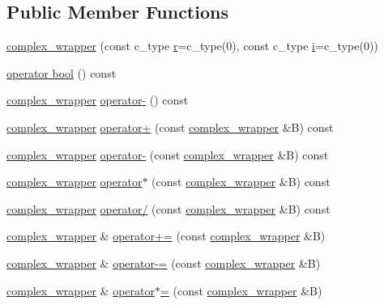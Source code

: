 \subsection*{Public Member Functions}
\begin{DoxyCompactItemize}
\item 
\hyperlink{classcomplex__wrapper_a6f027999d375bf7337f70188d937a470}{complex\+\_\+wrapper} (const c\+\_\+type \hyperlink{indexexpr_8h_ac434fd11cc2493608d8d91424d60c17e}{r}=c\+\_\+type(0), const c\+\_\+type \hyperlink{indexexpr_8h_aabd77643995707c185e95c8cb2782c81}{i}=c\+\_\+type(0))
\item 
\hyperlink{classcomplex__wrapper_acbe6a87a70ff51915f222ce85dfa34fc}{operator bool} () const 
\item 
\hyperlink{classcomplex__wrapper}{complex\+\_\+wrapper} \hyperlink{classcomplex__wrapper_aaa849d056b53f14985da78f2a469793e}{operator-\/} () const 
\item 
\hyperlink{classcomplex__wrapper}{complex\+\_\+wrapper} \hyperlink{classcomplex__wrapper_a0b2d24d7ef4f7aebbd6d81949c1b60e4}{operator+} (const \hyperlink{classcomplex__wrapper}{complex\+\_\+wrapper} \&B) const 
\item 
\hyperlink{classcomplex__wrapper}{complex\+\_\+wrapper} \hyperlink{classcomplex__wrapper_a538ba94866bee6c4ed40fc2cfacda0cb}{operator-\/} (const \hyperlink{classcomplex__wrapper}{complex\+\_\+wrapper} \&B) const 
\item 
\hyperlink{classcomplex__wrapper}{complex\+\_\+wrapper} \hyperlink{classcomplex__wrapper_a8859394ec76f29849031fe49bfbc664f}{operator$\ast$} (const \hyperlink{classcomplex__wrapper}{complex\+\_\+wrapper} \&B) const 
\item 
\hyperlink{classcomplex__wrapper}{complex\+\_\+wrapper} \hyperlink{classcomplex__wrapper_a1e4421efe8dc37864b7a6d194cbb8442}{operator/} (const \hyperlink{classcomplex__wrapper}{complex\+\_\+wrapper} \&B) const 
\item 
\hyperlink{classcomplex__wrapper}{complex\+\_\+wrapper} \& \hyperlink{classcomplex__wrapper_afb423c85ffe15ed9fb9f78a29f9b8138}{operator+=} (const \hyperlink{classcomplex__wrapper}{complex\+\_\+wrapper} \&B)
\item 
\hyperlink{classcomplex__wrapper}{complex\+\_\+wrapper} \& \hyperlink{classcomplex__wrapper_ac3624b3fcc6e38965a1626e393c55c67}{operator-\/=} (const \hyperlink{classcomplex__wrapper}{complex\+\_\+wrapper} \&B)
\item 
\hyperlink{classcomplex__wrapper}{complex\+\_\+wrapper} \& \hyperlink{classcomplex__wrapper_a6fefa3bba95e599cfac57fa9ce830f50}{operator$\ast$=} (const \hyperlink{classcomplex__wrapper}{complex\+\_\+wrapper} \&B)

\end{DoxyCompactItemize}
